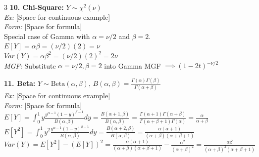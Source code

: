 \documentclass[10pt]{article}
\begin{document}
\begin{multicols*}{3}
\textbf{10. Chi-Square:} $Y \sim \chi^2(\nu)$\\
\textit{Ex:} [Space for continuous example]\\
\textit{Form:} [Space for formula]\\
Special case of Gamma with $\alpha = \nu/2$ and $\beta = 2$.\\
$E[Y] = \alpha\beta = (\nu/2)(2) = \nu$\\
$Var(Y) = \alpha\beta^2 = (\nu/2)(2)^2 = 2\nu$\\
\textit{MGF:} Substitute $\alpha = \nu/2, \beta=2$ into Gamma MGF $\implies (1-2t)^{-\nu/2}$

\vspace{2mm}

\textbf{11. Beta:} $Y \sim \text{Beta}(\alpha, \beta)$, $B(\alpha, \beta) = \frac{\Gamma(\alpha)\Gamma(\beta)}{\Gamma(\alpha+\beta)}$\\
\textit{Ex:} [Space for continuous example]\\
\textit{Form:} [Space for formula]\\
$E[Y] = \int_{0}^{1} y \frac{y^{\alpha-1} (1-y)^{\beta-1}}{B(\alpha, \beta)} dy = \frac{B(\alpha+1, \beta)}{B(\alpha, \beta)} = \frac{\Gamma(\alpha+1)\Gamma(\alpha+\beta)}{\Gamma(\alpha+\beta+1)\Gamma(\alpha)} = \frac{\alpha}{\alpha+\beta}$\\
$E[Y^2] = \int_{0}^{1} y^2 \frac{y^{\alpha-1} (1-y)^{\beta-1}}{B(\alpha, \beta)} dy = \frac{B(\alpha+2, \beta)}{B(\alpha, \beta)} = \frac{\alpha(\alpha+1)}{(\alpha+\beta)(\alpha+\beta+1)}$\\
$Var(Y) = E[Y^2] - (E[Y])^2 = \frac{\alpha(\alpha+1)}{(\alpha+\beta)(\alpha+\beta+1)} - \frac{\alpha^2}{(\alpha+\beta)^2} = \frac{\alpha\beta}{(\alpha+\beta)^2(\alpha+\beta+1)}$

\end{multicols*}
\end{document}
